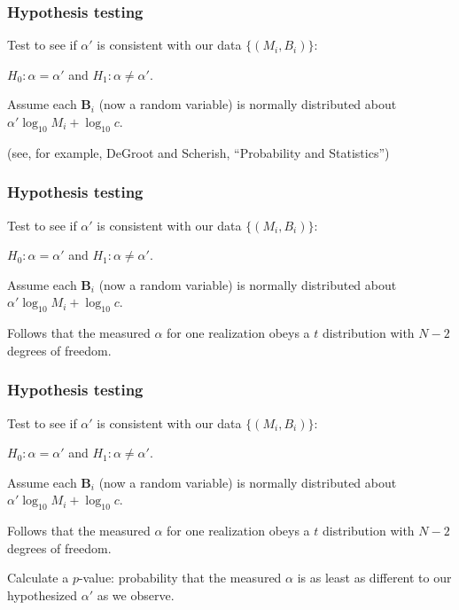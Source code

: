 \begin{frame}
  \frametitle{Hypothesis testing}

Test to see if $\alpha'$ is consistent
with our data $\{(M_i,B_i)\}$:

$H_0: \alpha = \alpha'$ and $H_1: \alpha \ne \alpha'.$

Assume each $\mathbf{B}_i$ (now a random variable) 
is normally distributed
about $\alpha' \log_{10} M_i + \log_{10} c$.


\inv


{\tiny (see, for example, DeGroot and Scherish, ``Probability and Statistics'')}

\vis

\end{frame}

\begin{frame}
  \frametitle{Hypothesis testing}

Test to see if $\alpha'$ is consistent
with our data $\{(M_i,B_i)\}$:

$H_0: \alpha = \alpha'$ and $H_1: \alpha \ne \alpha'.$

Assume each $\mathbf{B}_i$ (now a random variable) 
is normally distributed
about $\alpha' \log_{10} M_i + \log_{10} c$.

Follows that the measured $\alpha$ for
one realization obeys
a $t$ distribution with $N-2$ degrees of freedom.


\inv 

{\tiny {}}

\vis

\end{frame}

\begin{frame}
  \frametitle{Hypothesis testing}

Test to see if $\alpha'$ is consistent
with our data $\{(M_i,B_i)\}$:

$H_0: \alpha = \alpha'$ and $H_1: \alpha \ne \alpha'.$

Assume each $\mathbf{B}_i$ (now a random variable) 
is normally distributed
about $\alpha' \log_{10} M_i + \log_{10} c$.

Follows that the measured $\alpha$ for
one realization obeys
a $t$ distribution with $N-2$ degrees of freedom.

Calculate a $p$-value: probability that the measured
$\alpha$ is as least as different to our hypothesized
$\alpha'$ as we observe.

{\tiny {}}

\end{frame}


